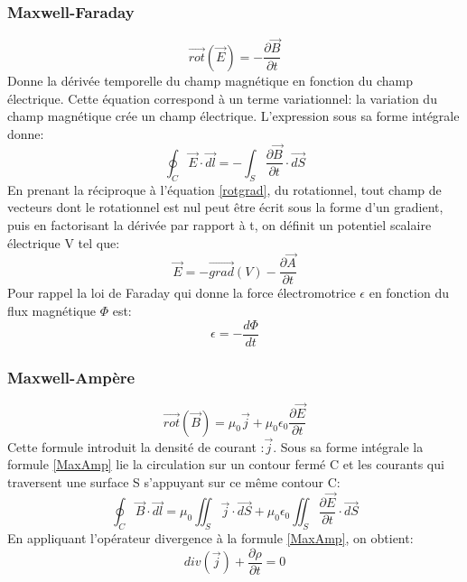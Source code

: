 \documentclass[10pt,a4paper]{article}
\begin{document}
\subsubsection{Maxwell-Faraday}
\begin{equation}
\overrightarrow{rot}(\overrightarrow{E}) = - \frac{\partial\overrightarrow{B}}{\partial t}
\label{MaxFar}
\end{equation}
Donne la dérivée temporelle du champ magnétique en fonction du champ électrique. Cette équation correspond à un terme variationnel: la variation du champ magnétique crée un champ électrique. L'expression sous sa forme intégrale donne:
\begin{equation}
\oint_{C}\overrightarrow{E}\cdot\overrightarrow{dl} = - \int_{S}\frac{\partial\overrightarrow{B}}{\partial t}\cdot\overrightarrow{dS}
\end{equation}
En prenant la réciproque à l'équation \ref{rotgrad}, du rotationnel,  tout champ de vecteurs dont le rotationnel est nul peut être écrit sous la forme d'un gradient, puis en factorisant la dérivée par rapport à t, on définit un potentiel scalaire électrique V tel que:
\begin{equation}
\overrightarrow{E} = - \overrightarrow{grad}(V) - \frac{\partial\overrightarrow{A}}{\partial t}
\end{equation}
Pour rappel la loi de Faraday qui donne la force électromotrice $\epsilon$ en fonction du flux magnétique $\Phi$ est:
\begin{equation}
\epsilon = - \frac{d\Phi}{dt}
\end{equation}

\subsubsection{Maxwell-Ampère}
\begin{equation}
\overrightarrow{rot}(\overrightarrow{B}) = \mu_{0}\overrightarrow{j} + \mu_{0}\epsilon_{0}\frac{\partial\overrightarrow{E}}{\partial t}
\label{MaxAmp}
\end{equation}
Cette formule introduit la densité de courant :$\overrightarrow{j}$.
Sous sa forme intégrale la formule \ref{MaxAmp} lie la circulation sur un contour fermé C et les courants qui traversent une surface S s'appuyant sur ce même contour C:
\begin{equation}
\oint_{C}\overrightarrow{B}\cdot\overrightarrow{dl} = \mu_{0}\iint_{S}\overrightarrow{j}\cdot\overrightarrow{dS} + \mu_{0}\epsilon_{0}\iint_{S}\frac{\partial\overrightarrow{E}}{\partial t}\cdot\overrightarrow{dS}
\end{equation}
En appliquant l'opérateur divergence à la formule \ref{MaxAmp}, on obtient:
\begin{equation}
div(\overrightarrow{j}) + \frac{\partial \rho}{\partial t} = 0
\end{equation}
\end{document}
